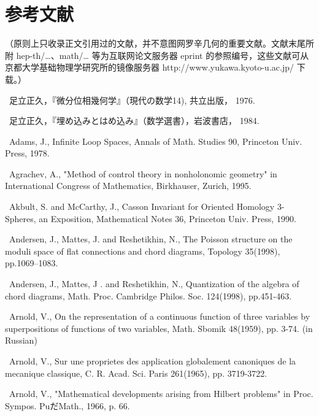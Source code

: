 \chapter*{参考文献}

{\small
\noindent （原则上只收录正文引用过的文献，并不意图网罗辛几何的重要文献。文献末尾所附 hep-th/…、math/… 等为互联网论文服务器 eprint 的参照编号，这些文献可从京都大学基础物理学研究所的镜像服务器 http://www.yukawa.kyoto-u.ac.jp/ 下载。）\par\medskip

\noindent [1]\ 足立正久，『微分位相幾何学』（現代の数学14), 共立出版， 1976.\par\smallskip
\noindent [2]\ 足立正久，『埋め込みとはめ込み』（数学選書），岩波書店， 1984.\par\smallskip
\noindent [3]\ Adams, J., Infinite Loop Spaces, Annals of Math. Studies 90, Princeton Univ. Press, 1978.\par\smallskip
\noindent [4]\ Agrachev, A., "Method of control theory in nonholonomic geometry" in International Congress of Mathematics, Birkhauser, Zurich, 1995.\par\smallskip
\noindent [5]\ Akbult, S. and McCarthy, J., Casson Invariant for Oriented Homology 3-Spheres, an Exposition, Mathematical Notes 36, Princeton Univ. Press, 1990.\par\smallskip
\noindent [6]\ Andersen, J., Mattes, J. and Reshetikhin, N., The Poisson structure on the moduli space of flat connections and chord diagrams, Topology 35(1998), pp.1069--1083.\par\smallskip
\noindent [7]\ Andersen, J., Mattes, J . and Reshetikhin, N., Quantization of the algebra of chord diagrams, Math. Proc. Cambridge Philos. Soc. 124(1998), pp.451-463.\par\smallskip
\noindent [8]\ Arnold, V., On the representation of a continuous function of three variables by superpositions of functions of two variables, Math. Sbomik 48(1959), pp. 3-74. (in Russian)\par\smallskip
\noindent [9]\ Arnold, V., Sur une proprietes des application globalement canoniques de la mecanique classique, C. R. Acad. Sci. Paris 261(1965), pp. 3719-3722.\par\smallskip
\noindent [10]\ Arnold, V., "Mathematical developments arising from Hilbert problems" in Proc. Sympos. PuだMath., 1966, p. 66.\par\smallskip
}
